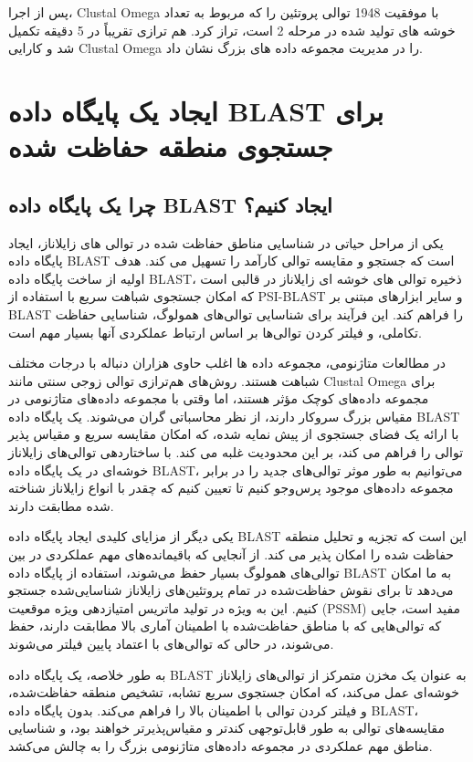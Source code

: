                 پس از اجرا، Clustal Omega با موفقیت 1948 توالی پروتئین را که مربوط به تعداد خوشه های تولید شده در مرحله 2 است، تراز کرد. هم ترازی تقریباً در 5 دقیقه تکمیل شد و کارایی Clustal Omega را در مدیریت مجموعه داده های بزرگ نشان داد.

        \section{ایجاد یک پایگاه داده BLAST برای جستجوی منطقه حفاظت شده}
            \subsection*{چرا یک پایگاه داده BLAST ایجاد کنیم؟}
                یکی از مراحل حیاتی در شناسایی مناطق حفاظت شده در توالی های زایلاناز، ایجاد پایگاه داده BLAST است که جستجو و مقایسه توالی کارآمد را تسهیل می کند. هدف اولیه از ساخت پایگاه داده BLAST، ذخیره توالی های خوشه ای زایلاناز در قالبی است که امکان جستجوی شباهت سریع با استفاده از PSI-BLAST و سایر ابزارهای مبتنی بر BLAST را فراهم کند. این فرآیند برای شناسایی توالی‌های همولوگ، شناسایی حفاظت تکاملی، و فیلتر کردن توالی‌ها بر اساس ارتباط عملکردی آنها بسیار مهم است.

                در مطالعات متاژنومی، مجموعه داده ها اغلب حاوی هزاران دنباله با درجات مختلف شباهت هستند. روش‌های هم‌ترازی توالی زوجی سنتی مانند Clustal Omega برای مجموعه داده‌های کوچک مؤثر هستند، اما وقتی با مجموعه داده‌های متاژنومی در مقیاس بزرگ سروکار دارند، از نظر محاسباتی گران می‌شوند. یک پایگاه داده BLAST با ارائه یک فضای جستجوی از پیش نمایه شده، که امکان مقایسه سریع و مقیاس پذیر توالی را فراهم می کند، بر این محدودیت غلبه می کند. با ساختاردهی توالی‌های زایلاناز خوشه‌ای در یک پایگاه داده BLAST، می‌توانیم به طور موثر توالی‌های جدید را در برابر مجموعه داده‌های موجود پرس‌وجو کنیم تا تعیین کنیم که چقدر با انواع زایلاناز شناخته شده مطابقت دارند.

                یکی دیگر از مزایای کلیدی ایجاد پایگاه داده BLAST این است که تجزیه و تحلیل منطقه حفاظت شده را امکان پذیر می کند. از آنجایی که باقیمانده‌های مهم عملکردی در بین توالی‌های همولوگ بسیار حفظ می‌شوند، استفاده از پایگاه داده BLAST به ما امکان می‌دهد تا برای نقوش حفاظت‌شده در تمام پروتئین‌های زایلاناز شناسایی‌شده جستجو کنیم. این به ویژه در تولید ماتریس امتیازدهی ویژه موقعیت (PSSM) مفید است، جایی که توالی‌هایی که با مناطق حفاظت‌شده با اطمینان آماری بالا مطابقت دارند، حفظ می‌شوند، در حالی که توالی‌های با اعتماد پایین فیلتر می‌شوند.

                به طور خلاصه، یک پایگاه داده BLAST به عنوان یک مخزن متمرکز از توالی‌های زایلاناز خوشه‌ای عمل می‌کند، که امکان جستجوی سریع تشابه، تشخیص منطقه حفاظت‌شده، و فیلتر کردن توالی با اطمینان بالا را فراهم می‌کند. بدون پایگاه داده BLAST، مقایسه‌های توالی به طور قابل‌توجهی کندتر و مقیاس‌پذیرتر خواهند بود، و شناسایی مناطق مهم عملکردی در مجموعه داده‌های متاژنومی بزرگ را به چالش می‌کشد.
